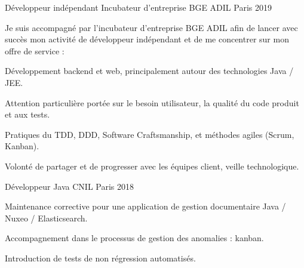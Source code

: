 

\begin{cventries}

  \cventry
    {Développeur indépendant} %
    {Incubateur d'entreprise BGE ADIL}
    {Paris} %
    {2019} %
    {
      \begin{cvitems} %
        \item {Je suis accompagné par l’incubateur d’entreprise BGE ADIL afin de lancer avec succès mon activité de développeur indépendant et de me concentrer sur mon offre de service : }
        \item {Développement backend et web, principalement autour des technologies Java / JEE.}
        \item {Attention particulière portée sur le besoin utilisateur, la qualité du code produit et aux tests.}
        \item {Pratiques du TDD, DDD, Software Craftsmanship, et méthodes agiles (Scrum, Kanban).}
        \item {Volonté de partager et de progresser avec les équipes client, veille technologique.}
      \end{cvitems}
    }

  \cventry
    {Développeur Java} %
    {CNIL} %
    {Paris} %
    {2018} %
    {
      \begin{cvitems} %
        \item {Maintenance corrective pour une application de gestion documentaire Java / Nuxeo / Elasticsearch.}
        \item {Accompagnement dans le processus de gestion des anomalies : kanban.}
        \item {Introduction de tests de non régression automatisés.}
      \end{cvitems}
    }


\end{cventries}
